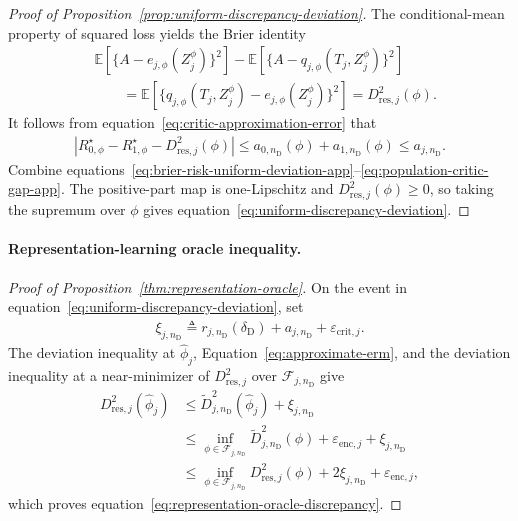 \begin{proof}[Proof of Proposition~\ref{prop:uniform-discrepancy-deviation}]
The conditional-mean property of squared loss yields the Brier identity
\begin{align}
&\mathbb E[\{A-e_{j,\phi}(Z_j^\phi)\}^2]
-\mathbb E[\{A-q_{j,\phi}(T_j,Z_j^\phi)\}^2]
\nonumber\\
&\qquad=
\mathbb E[\{q_{j,\phi}(T_j,Z_j^\phi)-e_{j,\phi}(Z_j^\phi)\}^2]
=D_{\mathrm{res},j}^2(\phi).
\label{eq:brier-residual-identity-app}
\end{align}
It follows from equation~\eqref{eq:critic-approximation-error} that
\begin{align}
\left|
R_{0,\phi}^{\star}-R_{1,\phi}^{\star}
-D_{\mathrm{res},j}^2(\phi)
\right|
\le
a_{0,n_{\mathrm D}}(\phi)+a_{1,n_{\mathrm D}}(\phi)
\le a_{j,n_{\mathrm D}}.
\label{eq:population-critic-gap-app}
\end{align}
Combine equations~\eqref{eq:brier-risk-uniform-deviation-app}--\eqref{eq:population-critic-gap-app}. The positive-part map is one-Lipschitz and $D_{\mathrm{res},j}^2(\phi)\ge0$, so taking the supremum over $\phi$ gives equation~\eqref{eq:uniform-discrepancy-deviation}.
\end{proof}

\paragraph{Representation-learning oracle inequality.}
\begin{proof}[Proof of Proposition~\ref{thm:representation-oracle}]
On the event in equation~\eqref{eq:uniform-discrepancy-deviation}, set
\begin{align}
\xi_{j,n_{\mathrm D}}
\triangleq
r_{j,n_{\mathrm D}}(\delta_{\mathrm D})+a_{j,n_{\mathrm D}}+\varepsilon_{\mathrm{crit},j}.
\end{align}
The deviation inequality at $\widehat\phi_j$, Equation~\eqref{eq:approximate-erm}, and the deviation inequality at a near-minimizer of $D_{\mathrm{res},j}^2$ over $\mathcal F_{j,n_{\mathrm D}}$ give
\begin{align}
D_{\mathrm{res},j}^2(\widehat\phi_j)
&\le
\widetilde D_{j,n_{\mathrm D}}^2(\widehat\phi_j)+\xi_{j,n_{\mathrm D}}\\
&\le
\inf_{\phi\in\mathcal F_{j,n_{\mathrm D}}}
\widetilde D_{j,n_{\mathrm D}}^2(\phi)
+\varepsilon_{\mathrm{enc},j}+\xi_{j,n_{\mathrm D}}\\
&\le
\inf_{\phi\in\mathcal F_{j,n_{\mathrm D}}}
D_{\mathrm{res},j}^2(\phi)
+2\xi_{j,n_{\mathrm D}}+\varepsilon_{\mathrm{enc},j},
\end{align}
which proves equation~\eqref{eq:representation-oracle-discrepancy}.
\end{proof}


